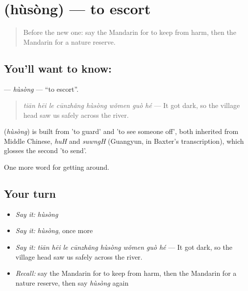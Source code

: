 \section[\texorpdfstring{\zh{护送} (hùsòng)}{护送 (hùsòng)}]{ (hùsòng) — to escort}

\label{lesson:ZH-C443-husong}



\begin{quote}
Before the new one: say the Mandarin for to keep from harm, then the Mandarin for a nature reserve.
\end{quote}

\subsection*{You'll want to know: }
\textbf{} — \emph{hùsòng} — \textquotedblleft{}to escort\textquotedblright{}.

\begin{quote}
\emph{tiān hēi le cūnzhǎng hùsòng wǒmen guò hé} — It got dark, so the village head saw us safely across the river.
\end{quote}

\begin{cousinweb}
\textbf{} (\emph{hùsòng}) is built from  'to guard' and  'to see someone off', both inherited from Middle Chinese, \emph{huH} and \emph{suwngH} (Guangyun, in Baxter's transcription), which glosses the second 'to send'.
\end{cousinweb}

\begin{grammarlens}[title={What you've built}]
One more word for getting around.
\end{grammarlens}

\subsection*{Your turn}
\begin{itemize}
\raggedright
  \item \emph{Say it:} \emph{hùsòng}
  \item \emph{Say it:} \emph{hùsòng}, once more
  \item \emph{Say it:} \emph{tiān hēi le cūnzhǎng hùsòng wǒmen guò hé} — It got dark, so the village head saw us safely across the river.
  \item \emph{Recall:} say the Mandarin for to keep from harm, then the Mandarin for a nature reserve, then say \emph{hùsòng} again
\end{itemize}

